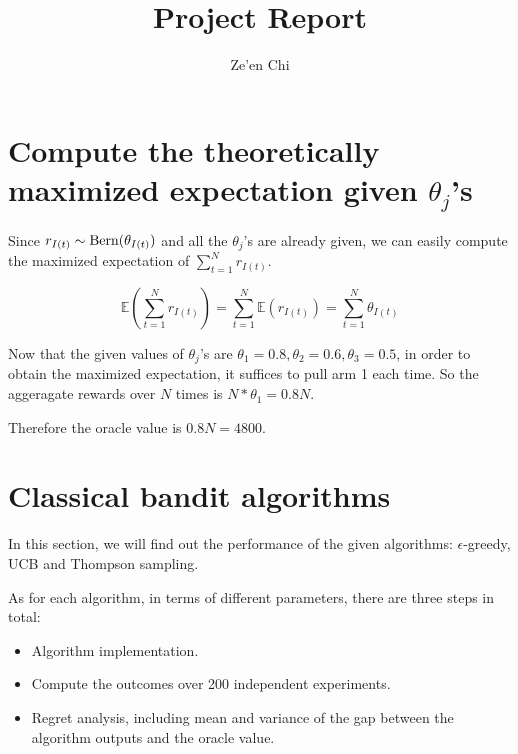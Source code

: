 \documentclass[11pt]{article}
\title{Project Report}
\author{Ze'en Chi}
\begin{document}
    
    \maketitle
    
    \hypertarget{compute-the-theoretically-maximized-expectation-given-theta_js}{%
\section{\texorpdfstring{Compute the theoretically maximized expectation
given
\(\theta_j\)'s}{Compute the theoretically maximized expectation given \textbackslash theta\_j's}}\label{compute-the-theoretically-maximized-expectation-given-theta_js}}

Since \(r_{I(t)}\sim{\rm Bern}(\theta_{I(t)})\) and all the
\(\theta_j\)'s are already given, we can easily compute the maximized
expectation of \(\sum\limits_{t=1}^Nr_{I(t)}\).

\[
\mathbb{E}\left(\sum\limits_{t=1}^Nr_{I(t)}\right)=\sum\limits_{t=1}^N\mathbb{E}(r_{I(t)})=\sum\limits_{t=1}^N\theta_{I(t)}
\]

Now that the given values of \(\theta_j\)'s are
\(\theta_1=0.8,\theta_2=0.6,\theta_3=0.5\), in order to obtain the
maximized expectation, it suffices to pull arm 1 each time. So the
aggeragate rewards over \(N\) times is \(N*\theta_1=0.8N\).

Therefore the oracle value is \(0.8N=4800\).

    \hypertarget{classical-bandit-algorithms}{%
\section{Classical bandit
algorithms}\label{classical-bandit-algorithms}}

In this section, we will find out the performance of the given
algorithms: \(\epsilon\)-greedy, UCB and Thompson sampling.

As for each algorithm, in terms of different parameters, there are three
steps in total:

\begin{itemize}
\item
  Algorithm implementation.
\item
  Compute the outcomes over 200 independent experiments.
\item
  Regret analysis, including mean and variance of the gap between the
  algorithm outputs and the oracle value.
\end{itemize}
\end{document}
